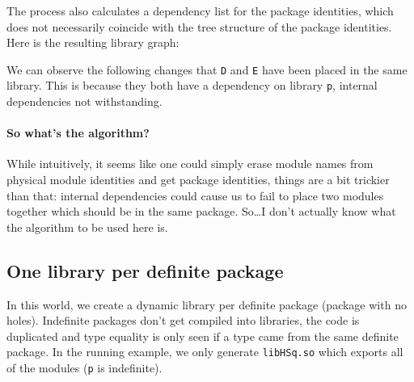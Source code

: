 \documentclass{article}
\begin{document}
The process also calculates a dependency list for the package
identities, which does not necessarily coincide with the tree structure
of the package identities. Here is the resulting library graph: \\


We can observe the following changes that \verb|D| and \verb|E| have
been placed in the same library.  This is because they both have a
dependency on library \verb|p|, internal dependencies not withstanding.

\paragraph{So what's the algorithm?}  While intuitively, it seems like
one could simply erase module names from physical module identities and
get package identities, things are a bit trickier than that: internal
dependencies could cause us to fail to place two modules together which
should be in the same package.  So\ldots I don't actually know what the
algorithm to be used here is.

\subsection{One library per definite package}\label{sec:one-per-definite-package}

In this world, we create a dynamic library per definite package (package with
no holes).  Indefinite packages don't get compiled into libraries, the code
is duplicated and type equality is only seen if a type came from the same
definite package.  In the running example, we only generate \verb|libHSq.so|
which exports all of the modules (\verb|p| is indefinite). \\

\end{document}
